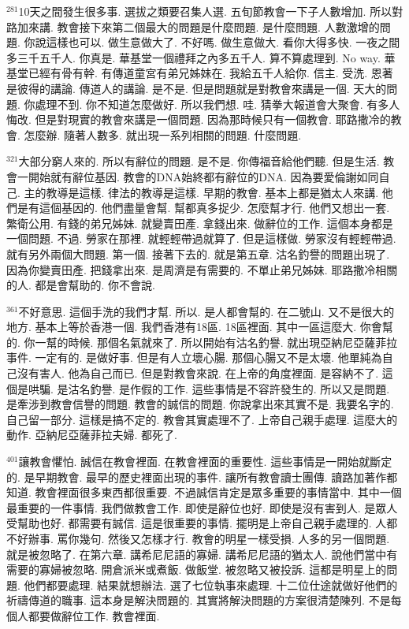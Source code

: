 \documentclass{book}
\begin{document}
$^{281}$10天之間發生很多事.
選拔之類要召集人選.
五旬節教會一下子人數增加.
所以對路加來講.
教會接下來第二個最大的問題是什麼問題.
是什麼問題.
人數激增的問題.
你說這樣也可以.
做生意做大了.
不好嗎.
做生意做大.
看你大得多快.
一夜之間多三千五千人.
你真是.
華基堂一個禮拜之內多五千人.
算不算處理到.
No way.
華基堂已經有骨有幹.
有傳道童宮有弟兄姊妹在.
我給五千人給你.
信主.
受洗.
恩著是彼得的講論.
傳道人的講論.
是不是.
但是問題就是對教會來講是一個.
天大的問題.
你處理不到.
你不知道怎麼做好.
所以我們想.
哇.
猜拳大報道會大聚會.
有多人悔改.
但是對現實的教會來講是一個問題.
因為那時候只有一個教會.
耶路撒冷的教會.
怎麼辦.
隨著人數多.
就出現一系列相關的問題.
什麼問題.

$^{321}$大部分窮人來的.
所以有辭位的問題.
是不是.
你傳福音給他們聽.
但是生活.
教會一開始就有辭位基因.
教會的DNA始終都有辭位的DNA.
因為要愛倫謝如同自己.
主的教導是這樣.
律法的教導是這樣.
早期的教會.
基本上都是猶太人來講.
他們是有這個基因的.
他們盡量會幫.
幫都真多捉少.
怎麼幫才行.
他們又想出一套.
繁衛公用.
有錢的弟兄姊妹.
就變賣田產.
拿錢出來.
做辭位的工作.
這個本身都是一個問題.
不過.
勞家在那裡.
就輕輕帶過就算了.
但是這樣做.
勞家沒有輕輕帶過.
就有另外兩個大問題.
第一個.
接著下去的.
就是第五章.
沽名釣譽的問題出現了.
因為你變賣田產.
把錢拿出來.
是周濟是有需要的.
不單止弟兄姊妹.
耶路撒冷相關的人.
都是會幫助的.
你不會說.

$^{361}$不好意思.
這個手洗的我們才幫.
所以.
是人都會幫的.
在二號山.
又不是很大的地方.
基本上等於香港一個.
我們香港有18區.
18區裡面.
其中一區這麼大.
你會幫的.
你一幫的時候.
那個名氣就來了.
所以開始有沽名釣譽.
就出現亞納尼亞薩菲拉事件.
一定有的.
是做好事.
但是有人立壞心腸.
那個心腸又不是太壞.
他單純為自己沒有害人.
他為自己而已.
但是對教會來說.
在上帝的角度裡面.
是容納不了.
這個是哄騙.
是沽名釣譽.
是作假的工作.
這些事情是不容許發生的.
所以又是問題.
是牽涉到教會信譽的問題.
教會的誠信的問題.
你說拿出來其實不是.
我要名字的.
自己留一部分.
這樣是搞不定的.
教會其實處理不了.
上帝自己親手處理.
這麼大的動作.
亞納尼亞薩菲拉夫婦.
都死了.

$^{401}$讓教會懼怕.
誠信在教會裡面.
在教會裡面的重要性.
這些事情是一開始就斷定的.
是早期教會.
最早的歷史裡面出現的事件.
讓所有教會讀士團傳.
讀路加著作都知道.
教會裡面很多東西都很重要.
不過誠信肯定是眾多重要的事情當中.
其中一個最重要的一件事情.
我們做教會工作.
即使是辭位也好.
即使是沒有害到人.
是眾人受幫助也好.
都需要有誠信.
這是很重要的事情.
擺明是上帝自己親手處理的.
人都不好辦事.
罵你幾句.
然後又怎樣才行.
教會的明星一樣受損.
人多的另一個問題.
就是被忽略了.
在第六章.
講希尼尼語的寡婦.
講希尼尼語的猶太人.
說他們當中有需要的寡婦被忽略.
開倉派米或煮飯.
做飯堂.
被忽略又被投訴.
這都是明星上的問題.
他們都要處理.
結果就想辦法.
選了七位執事來處理.
十二位仕途就做好他們的祈禱傳道的職事.
這本身是解決問題的.
其實將解決問題的方案很清楚陳列.
不是每個人都要做辭位工作.
教會裡面.
\end{document}
